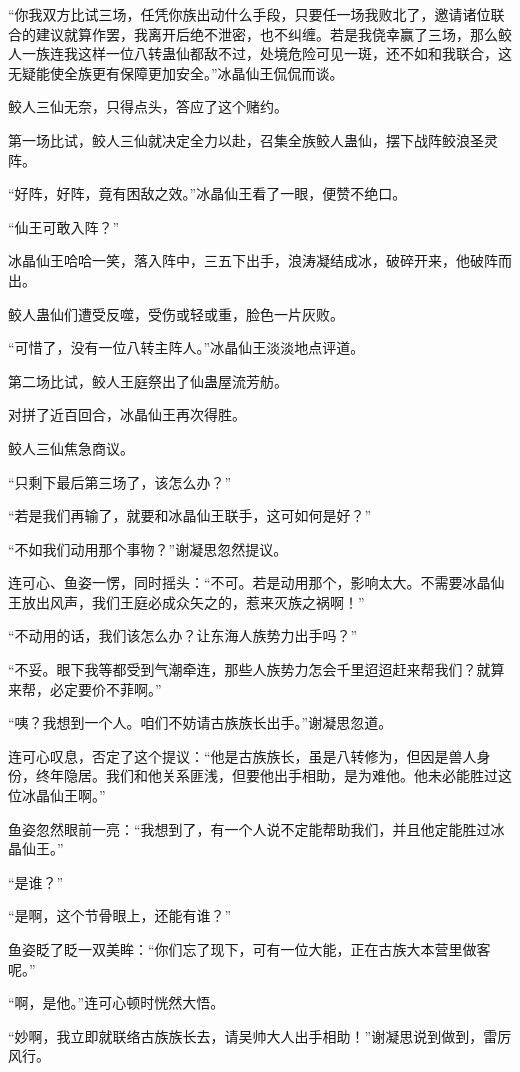 \begin{this_body}
“你我双方比试三场，任凭你族出动什么手段，只要任一场我败北了，邀请诸位联合的建议就算作罢，我离开后绝不泄密，也不纠缠。若是我侥幸赢了三场，那么鲛人一族连我这样一位八转蛊仙都敌不过，处境危险可见一斑，还不如和我联合，这无疑能使全族更有保障更加安全。”冰晶仙王侃侃而谈。

鲛人三仙无奈，只得点头，答应了这个赌约。

第一场比试，鲛人三仙就决定全力以赴，召集全族鲛人蛊仙，摆下战阵鲛浪圣灵阵。

“好阵，好阵，竟有困敌之效。”冰晶仙王看了一眼，便赞不绝口。

“仙王可敢入阵？”

冰晶仙王哈哈一笑，落入阵中，三五下出手，浪涛凝结成冰，破碎开来，他破阵而出。

鲛人蛊仙们遭受反噬，受伤或轻或重，脸色一片灰败。

“可惜了，没有一位八转主阵人。”冰晶仙王淡淡地点评道。

第二场比试，鲛人王庭祭出了仙蛊屋流芳舫。

对拼了近百回合，冰晶仙王再次得胜。

鲛人三仙焦急商议。

“只剩下最后第三场了，该怎么办？”

“若是我们再输了，就要和冰晶仙王联手，这可如何是好？”

“不如我们动用那个事物？”谢凝思忽然提议。

连可心、鱼姿一愣，同时摇头：“不可。若是动用那个，影响太大。不需要冰晶仙王放出风声，我们王庭必成众矢之的，惹来灭族之祸啊！”

“不动用的话，我们该怎么办？让东海人族势力出手吗？”

“不妥。眼下我等都受到气潮牵连，那些人族势力怎会千里迢迢赶来帮我们？就算来帮，必定要价不菲啊。”

“咦？我想到一个人。咱们不妨请古族族长出手。”谢凝思忽道。

连可心叹息，否定了这个提议：“他是古族族长，虽是八转修为，但因是兽人身份，终年隐居。我们和他关系匪浅，但要他出手相助，是为难他。他未必能胜过这位冰晶仙王啊。”

鱼姿忽然眼前一亮：“我想到了，有一个人说不定能帮助我们，并且他定能胜过冰晶仙王。”

“是谁？”

“是啊，这个节骨眼上，还能有谁？”

鱼姿眨了眨一双美眸：“你们忘了现下，可有一位大能，正在古族大本营里做客呢。”

“啊，是他。”连可心顿时恍然大悟。

“妙啊，我立即就联络古族族长去，请吴帅大人出手相助！”谢凝思说到做到，雷厉风行。

\end{this_body}

